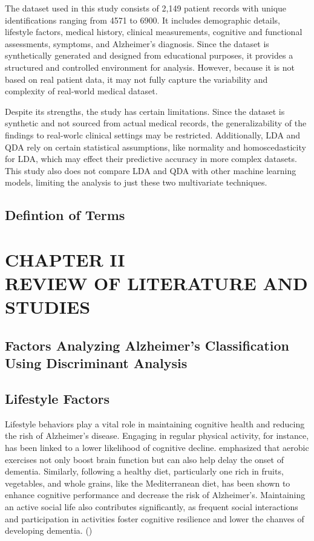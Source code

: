 \documentclass[12pt]{article}
\begin{document}
The dataset used in this study consists of 2,149 patient records with unique identifications ranging from 4571 to 6900. It includes demographic details, lifestyle factors, medical history, clinical measurements, cognitive and functional
assessments, symptoms, and Alzheimer's diagnosis. Since the dataset is synthetically generated and designed from educational purposes, it provides a structured and controlled environment for analysis. However, because it is not based on real patient data, 
it may not fully capture the variability and complexity of real-world medical dataset. 

Despite its strengths, the study has certain limitations. Since the dataset is synthetic and not sourced from actual medical records, the generalizability of the findings to real-worlc clinical settings may be restricted. Additionally, LDA and QDA rely on certain
statistical assumptions, like normality and homoscedasticity for LDA, which may effect their predictive accuracy in more complex datasets. This study also does not compare LDA and QDA with other machine learning models, limiting the analysis to just these two multivariate
techniques. 

\subsection{Defintion of Terms}

\section{CHAPTER II \\ REVIEW OF LITERATURE AND STUDIES}

\subsection{Factors Analyzing Alzheimer's Classification Using Discriminant Analysis}
\subsection {Lifestyle Factors}
\noindent

Lifestyle behaviors play a vital role in maintaining cognitive health and reducing the rish of Alzheimer's disease. Engaging in regular physical activity, for instance, has been linked to a lower likelihood of cognitive decline. \cite{Dominguez2021} emphasized that aerobic
exercises not only boost brain function but can also help delay the onset of dementia. Similarly, following a healthy diet, particularly one rich in fruits, vegetables, and whole grains, like the Mediterranean diet, has been shown to enhance cognitive performance and decrease
the risk of Alzheimer's. Maintaining an active social life also contributes significantly, as frequent social interactions and participation in activities foster cognitive resilience and lower the chanves of developing dementia. (\cite{Dominguez2021})
\end{document}
